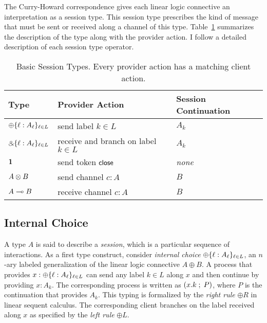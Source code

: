 The Curry-Howard correspondence gives each linear logic connective an
interpretation as a session type. This session type prescribes the kind of
message that must be sent or received along a channel of this type.
Table~\ref{tab:basic-types} summarizes the description of the type
along with the provider action. I follow a detailed description of each
session type operator.
\begin{table}[t]
\centering
\renewcommand{\arraystretch}{1.3}
\begin{tabular}{l|l|l}
\textbf{Type} & \textbf{Provider Action} & \textbf{Session Continuation} \\\hline
$\oplus \{ \ell : A_\ell \}_{\ell \in L}$ & send label $k \in L$ & $A_k$ \\
$\mathbin{\binampersand} \{ \ell : A_\ell \}_{\ell \in L}$ & receive and branch on label $k \in L$ & $A_k$ \\
$\mathbf{1}$ & send token $\mathsf{close}$ & \emph{none} \\
$A \otimes B$ & send channel $c : A$ & $B$ \\
$A \multimap B$ & receive channel $c : A$ & $B$
\end{tabular}
\caption{Basic Session Types.  Every provider action has a matching
client action.}
\label{tab:basic-types}
\end{table}

\subsection*{Internal Choice}
A type $A$ is said to describe a \emph{session}, which is a particular
sequence of interactions. As a first type construct, consider \emph{internal
choice} $\oplus \{ \ell : A_\ell \}_{\ell \in L}$, an $n$-ary labeled
generalization of the linear logic connective $A \oplus B$. A process
that provides $x : \oplus \{ \ell : A_\ell \}_{\ell \in L}$ can send any label
$k \in L$ along $x$ and then continue by providing $x : A_k$. The
corresponding process is written as $(x.k \; ; \; P)$, where
$P$ is the continuation that provides $A_k$. This typing is formalized
by the \emph{right rule} $\oplus R$ in linear sequent calculus. The
corresponding client branches on the label received along $x$ as specified
by the \emph{left rule} $\oplus L$.

